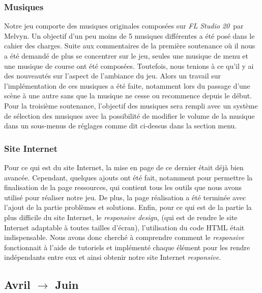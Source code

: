 \documentclass[a4paper,12pt]{article}
\newcommand{\FL}{\textsl{FL Studio 20}}
\begin{document}
            \subsubsection{Musiques}
                Notre jeu comporte des musiques originales composées sur \FL\, par Melvyn. Un objectif d'un 
                peu moins de 5 musiques différentes a été posé dans le cahier des charges. Suite aux 
                commentaires de la première soutenance où il nous a été demandé de plus se concentrer sur le
                jeu, seules une musique de menu et une musique de course ont été composées. Toutefois, nous 
                tenions à ce qu'il y ai des nouveautés sur l'aspect de l'ambiance du jeu. Alors un travail 
                sur l'implémentation de ces musiques a été faite, notamment lors du passage d'une scène à
                une autre sans que la musique ne cesse ou recommence depuis le début. Pour la troisième 
                soutenance, l'objectif des musiques sera rempli avec un système de sélection des musiques 
                avec la possibilité de modifier le volume de la musique dans un sous-menus de réglages comme
                dit ci-dessus dans la section menu.

            \subsubsection{Site Internet}
                Pour ce qui est du site Internet, la mise en page de ce dernier était déjà bien avancée. 
                Cependant, quelques ajouts ont été fait, notamment pour permettre la finalisation de la 
                page ressources, qui contient tous les outils que nous avons utilisé pour réaliser notre 
                jeu. De plus, la page réalisation a été terminée avec l'ajout de la partie 
                problèmes et solutions.
                Enfin, pour ce qui est de la partie la plus difficile du site Internet, le \textit{responsive 
                design}, (qui est de rendre le site Internet adaptable à toutes tailles d'écran), l'utilisation 
                du code HTML était indispensable. Nous avons donc cherché à comprendre comment le 
                \textit{responsive} fonctionnait à l'aide de tutoriels et implémenté chaque élément 
                pour les rendre indépendants entre eux et ainsi obtenir notre site Internet \textit{responsive}.

        \subsection{Avril $\to$ Juin}
\end{document}

